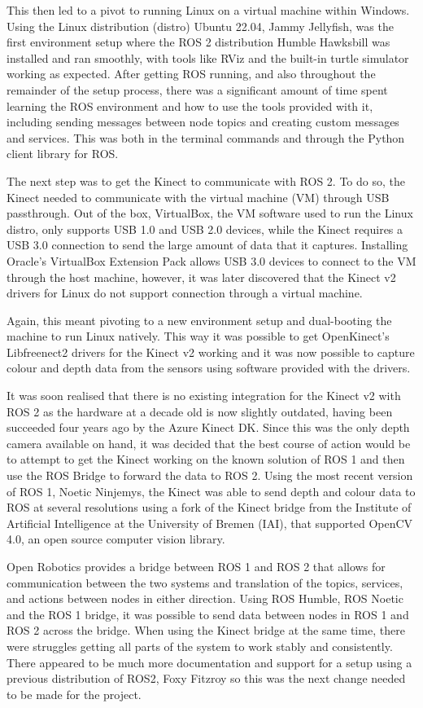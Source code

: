 This then led to a pivot to running Linux on a virtual machine within Windows.
Using the Linux distribution (distro) Ubuntu 22.04, Jammy Jellyfish, was the first environment setup where the ROS 2 distribution Humble Hawksbill was installed and ran smoothly, with tools like RViz and the built-in turtle simulator working as expected.
After getting ROS running, and also throughout the remainder of the setup process, there was a significant amount of time spent learning the ROS environment and how to use the tools provided with it, including sending messages between node topics and creating custom messages and services.
This was both in the terminal commands and through the Python client library for ROS.

The next step was to get the Kinect to communicate with ROS 2.
To do so, the Kinect needed to communicate with the virtual machine (VM) through USB passthrough.
Out of the box, VirtualBox, the VM software used to run the Linux distro, only supports USB 1.0 and USB 2.0 devices, while the Kinect requires a USB 3.0 connection to send the large amount of data that it captures.
Installing Oracle's VirtualBox Extension Pack allows USB 3.0 devices to connect to the VM through the host machine, however, it was later discovered that the Kinect v2 drivers for Linux do not support connection through a virtual machine.

Again, this meant pivoting to a new environment setup and dual-booting the machine to run Linux natively.
This way it was possible to get OpenKinect's Libfreenect2 drivers for the Kinect v2 working and it was now possible to capture colour and depth data from the sensors using software provided with the drivers.

It was soon realised that there is no existing integration for the Kinect v2 with ROS 2 as the hardware at a decade old is now slightly outdated, having been succeeded four years ago by the Azure Kinect DK.
Since this was the only depth camera available on hand, it was decided that the best course of action would be to attempt to get the Kinect working on the known solution of ROS 1 and then use the ROS Bridge to forward the data to ROS 2.
Using the most recent version of ROS 1, Noetic Ninjemys, the Kinect was able to send depth and colour data to ROS at several resolutions using a fork of the Kinect bridge from the Institute of Artificial Intelligence at the University of Bremen (IAI), that supported OpenCV 4.0, an open source computer vision library.

Open Robotics provides a bridge between ROS 1 and ROS 2 that allows for communication between the two systems and translation of the topics, services, and actions between nodes in either direction.
Using ROS Humble, ROS Noetic and the ROS 1 bridge, it was possible to send data between nodes in ROS 1 and ROS 2 across the bridge.
When using the Kinect bridge at the same time, there were struggles getting all parts of the system to work stably and consistently.
There appeared to be much more documentation and support for a setup using a previous distribution of ROS2, Foxy Fitzroy so this was the next change needed to be made for the project.

